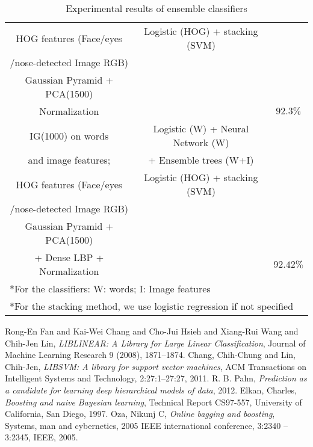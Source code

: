 \begin{table}[h!]
\begin{tabular}{ c c c}
HOG features (Face/eyes & Logistic (HOG) + stacking (SVM) &\\
/nose-detected Image RGB) & &  \\ 
Gaussian Pyramid + PCA(1500) & & \\
Normalization & & $92.3\%$  \\ \hline
IG(1000) on words & Logistic (W) + Neural Network (W) & \\ 
and image features; & + Ensemble trees (W+I) & \\
HOG features (Face/eyes & Logistic (HOG) + stacking (SVM) &\\
/nose-detected Image RGB) & &  \\ 
Gaussian Pyramid + PCA(1500) & & \\
+ Dense LBP + Normalization & & $92.42\%$  \\ \hline
\multicolumn{3}{l}{*For the classifiers: W: words; I: Image features} \\
\multicolumn{3}{l}{*For the stacking method, we use logistic regression if not specified} \\
\hline
\end{tabular}
\caption{Experimental results of ensemble classifiers}
\label{Table 2}
\end{table}



\begin{thebibliography}{9}

  Rong-En Fan and Kai-Wei Chang and Cho-Jui Hsieh and Xiang-Rui Wang and Chih-Jen Lin,
  \emph{{LIBLINEAR}: A Library for Large Linear Classification},
  Journal of Machine Learning Research 9 (2008), 1871--1874.
    Chang, Chih-Chung and Lin, Chih-Jen, 
    \emph{{LIBSVM}: A library for support vector machines},
    ACM Transactions on Intelligent Systems and Technology, 2:27:1--27:27, 2011.
    R. B. Palm,
    \emph{Prediction as a candidate for learning deep hierarchical models of data},
    2012.
    Elkan, Charles,
    \emph{Boosting and naive Bayesian learning},
    {Technical Report CS97-557, University of California, San Diego}, 1997.
    Oza, Nikunj C,
    \emph{Online bagging and boosting},
    Systems, man and cybernetics, 2005 IEEE international conference, 3:2340 -- 3:2345, IEEE, 2005.

\end{thebibliography}